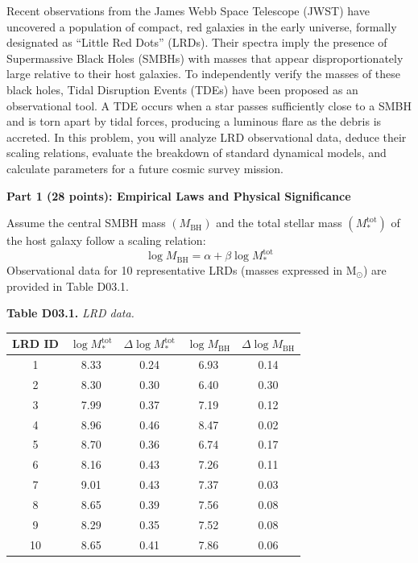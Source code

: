 Recent observations from the James Webb Space Telescope (JWST) have uncovered
a population of compact, red galaxies in the early universe, formally
designated as ``Little Red Dots'' (LRDs). Their spectra imply the presence of
Supermassive Black Holes (SMBHs) with masses that appear disproportionately
large relative to their host galaxies. To independently verify the masses of
these black holes, Tidal Disruption Events (TDEs) have been proposed as an
observational tool. A TDE occurs when a star passes sufficiently close to a
SMBH and is torn apart by tidal forces, producing a luminous flare as the
debris is accreted. In this problem, you will analyze LRD observational data,
deduce their scaling relations, evaluate the breakdown of standard dynamical
models, and calculate parameters for a future cosmic survey mission.

\medskip\noindent\textbf{Part 1 (28 points): Empirical Laws and Physical Significance}

Assume the central SMBH mass $(M_{\mathrm{BH}})$ and the total stellar mass
$(M_*^{\mathrm{tot}})$ of the host galaxy follow a scaling relation:
\[
\log M_{\mathrm{BH}} = \alpha + \beta \log M_*^{\mathrm{tot}}
\]
Observational data for 10 representative LRDs (masses expressed in
$\mathrm{M}_\odot$) are provided in Table D03.1.

\begin{center}
\textbf{Table D03.1.} \textit{LRD data.}

\medskip
\begin{tabular}{ccccc}
\toprule
LRD ID & $\log M_*^{\mathrm{tot}}$ & $\Delta\log M_*^{\mathrm{tot}}$
       & $\log M_{\mathrm{BH}}$ & $\Delta\log M_{\mathrm{BH}}$ \\
\midrule
1  & 8.33 & 0.24 & 6.93 & 0.14 \\
2  & 8.30 & 0.30 & 6.40 & 0.30 \\
3  & 7.99 & 0.37 & 7.19 & 0.12 \\
4  & 8.96 & 0.46 & 8.47 & 0.02 \\
5  & 8.70 & 0.36 & 6.74 & 0.17 \\
6  & 8.16 & 0.43 & 7.26 & 0.11 \\
7  & 9.01 & 0.43 & 7.37 & 0.03 \\
8  & 8.65 & 0.39 & 7.56 & 0.08 \\
9  & 8.29 & 0.35 & 7.52 & 0.08 \\
10 & 8.65 & 0.41 & 7.86 & 0.06 \\
\bottomrule
\end{tabular}
\end{center}

